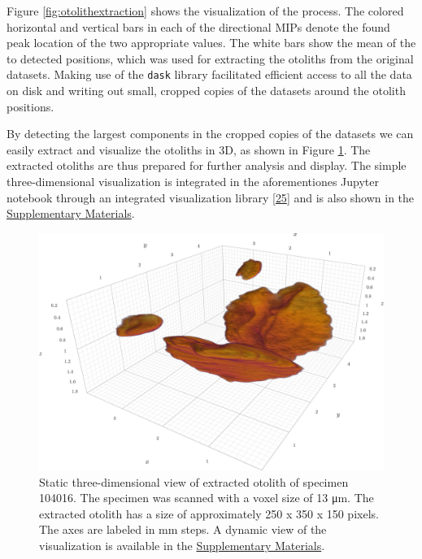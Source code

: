 Figure \ref{fig:otolithextraction} shows the visualization of the process.
The colored horizontal and vertical bars in each of the directional MIPs denote the found peak location of the two appropriate values.
The white bars show the mean of the to detected positions, which was used for extracting the otoliths from the original datasets.
Making use of the \texttt{dask} library facilitated efficient access to all the data on disk and writing out small, cropped copies of the datasets around the otolith positions.

By detecting the largest components in the cropped copies of the datasets we can easily extract and visualize the otoliths in 3D, as shown in Figure \ref{fig:otolith3d}.
The extracted otoliths are thus prepared for further analysis and display.
The simple three-dimensional visualization is integrated in the aforementiones Jupyter notebook through an integrated visualization library {[}\protect\hyperlink{ref-a9ZL41Of}{25}{]} and is also shown in the \protect\hyperlink{supplementary-materials}{Supplementary Materials}.

\begin{figure}
\hypertarget{fig:otolith3d}{%
\centering
\includegraphics{images/104016.head.rec.otolith.region.3D.png}
\caption{Static three-dimensional view of extracted otolith of specimen 104016. The specimen was scanned with a voxel size of 13 μm. The extracted otolith has a size of approximately 250 x 350 x 150 pixels. The axes are labeled in mm steps. A dynamic view of the visualization is available in the \protect\hyperlink{supplementary-materials}{Supplementary Materials}.}\label{fig:otolith3d}
}
\end{figure}

